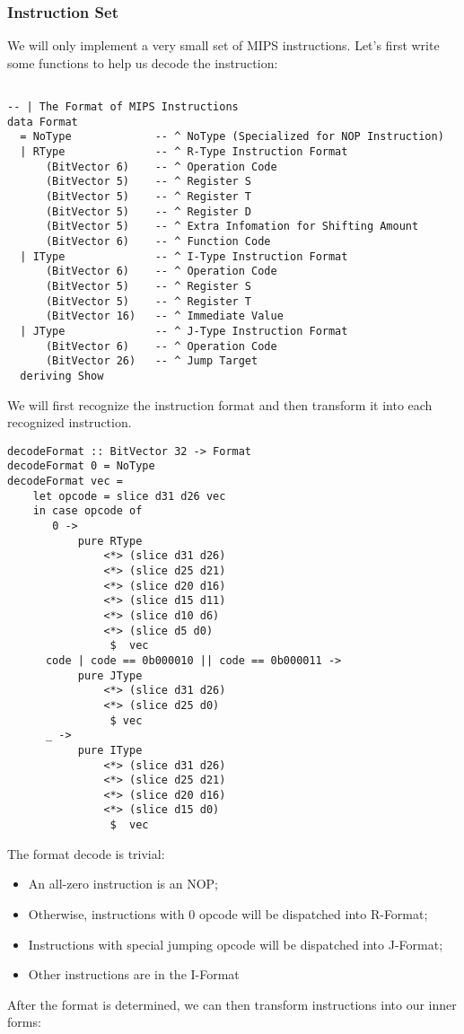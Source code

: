 \subsubsection{Instruction Set}
We will only implement a very small set of MIPS instructions. Let's first write some functions to help us decode the instruction:
\begin{verbatim}

-- | The Format of MIPS Instructions
data Format            
  = NoType             -- ^ NoType (Specialized for NOP Instruction)
  | RType              -- ^ R-Type Instruction Format
      (BitVector 6)    -- ^ Operation Code
      (BitVector 5)    -- ^ Register S
      (BitVector 5)    -- ^ Register T
      (BitVector 5)    -- ^ Register D
      (BitVector 5)    -- ^ Extra Infomation for Shifting Amount
      (BitVector 6)    -- ^ Function Code
  | IType              -- ^ I-Type Instruction Format
      (BitVector 6)    -- ^ Operation Code
      (BitVector 5)    -- ^ Register S
      (BitVector 5)    -- ^ Register T
      (BitVector 16)   -- ^ Immediate Value
  | JType              -- ^ J-Type Instruction Format 
      (BitVector 6)    -- ^ Operation Code
      (BitVector 26)   -- ^ Jump Target
  deriving Show
\end{verbatim}
We will first recognize the instruction format and then transform it into each recognized instruction.
\begin{verbatim}
decodeFormat :: BitVector 32 -> Format
decodeFormat 0 = NoType
decodeFormat vec =
    let opcode = slice d31 d26 vec
    in case opcode of
       0 ->
           pure RType 
               <*> (slice d31 d26)
               <*> (slice d25 d21) 
               <*> (slice d20 d16) 
               <*> (slice d15 d11) 
               <*> (slice d10 d6) 
               <*> (slice d5 d0) 
                $  vec
      code | code == 0b000010 || code == 0b000011 ->
           pure JType 
               <*> (slice d31 d26) 
               <*> (slice d25 d0) 
                $ vec
      _ ->
           pure IType 
               <*> (slice d31 d26) 
               <*> (slice d25 d21) 
               <*> (slice d20 d16) 
               <*> (slice d15 d0) 
                $  vec
\end{verbatim}
The format decode is trivial:
\begin{itemize}
	\item An all-zero instruction is an NOP;
	\item Otherwise, instructions with 0 opcode will be dispatched into R-Format;
	\item Instructions with special jumping opcode will be dispatched into J-Format;
	\item Other instructions are in the I-Format
\end{itemize}
After the format is determined, we can then transform instructions into our inner forms:

